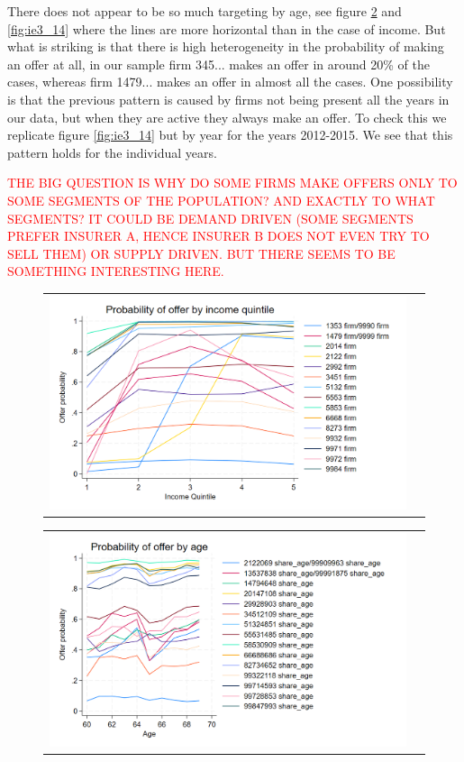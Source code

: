 \documentclass[12pt]{article}
\begin{document}
There does not appear to be so much targeting by age, see figure \ref{fig:ie3_13} and \ref{fig:ie3_14} where the lines are more horizontal than in the case of income. But what is striking is that there is high heterogeneity in the probability of making an offer at all, in our sample firm 345... makes an offer in around 20\% of the cases, whereas firm 1479... makes an offer in almost all the cases.
One possibility is that the previous pattern is caused by firms not being present all the years in our data, but when they are active they always make an offer. To check this we replicate figure \ref{fig:ie3_14} but by year for the years 2012-2015. We see that this pattern holds for the individual years. 


\textcolor{red}{THE BIG QUESTION IS WHY DO SOME FIRMS MAKE OFFERS ONLY TO SOME SEGMENTS OF THE POPULATION? AND EXACTLY TO WHAT SEGMENTS? IT COULD BE DEMAND DRIVEN (SOME SEGMENTS PREFER INSURER A, HENCE INSURER B DOES NOT EVEN TRY TO SELL THEM) OR SUPPLY DRIVEN. BUT THERE SEEMS TO BE SOMETHING INTERESTING HERE.}


\begin{figure}[H]
\caption{}
\label{fig:ie3_12}
\centering{}%
\begin{tabular}{cc}
\includegraphics[scale=0.27]{figures/IE3_supply_offerprob_income_q.png}
\end{tabular}
\end{figure}


\begin{figure}[H]
\caption{}
\label{fig:ie3_13}
\centering{}%
\begin{tabular}{cc}
\includegraphics[scale=0.27]{figures/IE3_supply_offerprob_age.png}
\end{tabular}
\end{figure}
\end{document}
